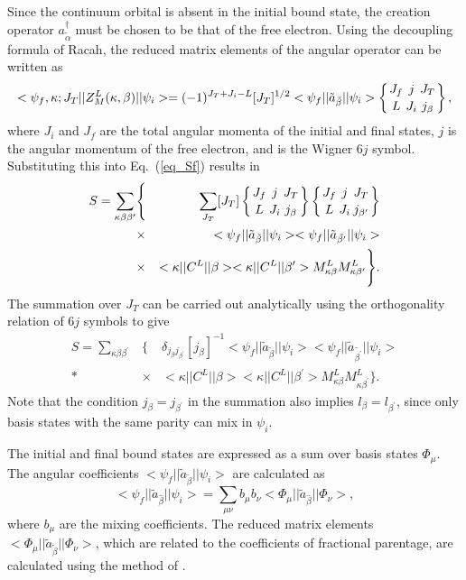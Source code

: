 Since the continuum orbital is absent in the initial bound state, the creation
operator $a^{\dagger}_{\tilde{\alpha}}$ must be chosen to be that of the free
electron. Using the decoupling formula of Racah, the reduced matrix elements
of the angular operator can be written as
\begin{equation}
<\psi_f,\kappa;J_T||Z^L_M(\kappa,\beta)||\psi_i>=(-1)^{J_T+J_i-L}[J_T]^{1/2}
<\psi_f||\tilde{a}_{\tilde{\beta}}||\psi_i>\sixj{J_f}{j}{J_T}{L}{J_i}{j_\beta},
\end{equation}
where $J_i$ and $J_f$ are the total angular momenta of the initial and final
states, $j$ is the angular momentum of the free electron, and
 is the Wigner $6j$ symbol. Substituting
this into Eq.~(\ref{eq_Sf}) results in
\begin{eqnarray}
S=\sum_{\kappa\beta\beta^\prime}&\Bigg\{&\sum_{J_T}[J_T]
\sixj{J_f}{j}{J_T}{L}{J_i}{j_\beta}
\sixj{J_f}{j}{J_T}{L}{J_i}{j_{\beta^\prime}} 
\nonumber\\*
&\times&
<\psi_f||\tilde{a}_{\tilde{\beta}}||\psi_i>
<\psi_f||\tilde{a}_{\tilde{\beta^\prime}}||\psi_i> 
\nonumber\\*
&\times& 
<\kappa||C^L||\beta><\kappa||C^L||\beta^\prime>
M^L_{\kappa\beta}M^L_{\kappa\beta^\prime}\Bigg\}.
\end{eqnarray}
The summation over $J_T$ can be carried out analytically using the
orthogonality relation of $6j$ symbols to give
\begin{eqnarray}
S=\sum_{\kappa\beta\beta^\prime}&\Bigg\{&\delta_{j_\beta
j_{\beta^\prime}}[j_\beta]^{-1} <\psi_f||\tilde{a}_{\tilde{\beta}}||\psi_i>
<\psi_f||\tilde{a}_{\tilde{\beta^\prime}}||\psi_i>
\nonumber\\*
&\times&
<\kappa||C^L||\beta><\kappa||C^L||\beta^\prime>
M^L_{\kappa\beta}M^L_{\kappa\beta^\prime}\Bigg\}.
\end{eqnarray}
Note that the condition $j_\beta = j_{\beta^\prime}$ in the summation also
implies $l_\beta = l_{\beta^\prime}$, since only basis states with the same
parity can mix in $\psi_i$. 

The initial and final bound states are expressed as a sum over basis states
$\Phi_\mu$. The angular coefficients
$<\psi_f||\tilde{a}_{\tilde{\beta}}||\psi_i>$ are calculated as
\begin{equation}
<\psi_f||\tilde{a}_{\hat{\beta}}||\psi_i> = \sum_{\mu\nu}b_\mu b_\nu
<\Phi_\mu||\tilde{a}_{\hat{\beta}}||\Phi_\nu>,
\end{equation}
where $b_\mu$ are the mixing coefficients. The reduced matrix elements
$<\Phi_\mu||\tilde{a}_{\tilde{\beta}}||\Phi_\nu>$, which are related to the
coefficients of fractional parentage, are calculated using the method of
\citet{gaigalas97}. 

